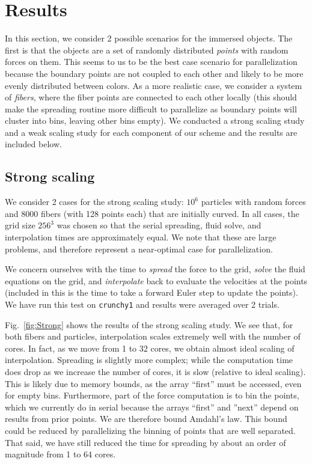 \documentclass[]{article}
\begin{document}
\section{Results}
In this section, we consider 2 possible scenarios for the immersed objects. The first is that the objects are a set of randomly distributed \textit{points} with random forces on them. This seems to us to be the best case scenario for parallelization because the boundary points are not coupled to each other and likely to be more evenly distributed between colors. As a more realistic case, we consider a system of \textit{fibers}, where the fiber points are connected to each other locally (this should make the spreading routine more difficult to parallelize as boundary points will cluster into bins, leaving other bins empty). We conducted a strong scaling study and a weak scaling study for each component of our scheme and the results are included below.

\subsection{Strong scaling}
We consider 2 cases for the strong scaling study: $10^6$ particles with random forces and 8000 fibers (with 128 points each) that are initially curved. In all cases, the grid size $256^3$ was chosen so that the serial spreading, fluid solve, and interpolation times are approximately equal. We note that these are large problems, and therefore represent a near-optimal case for parallelization. 

We concern ourselves with the time to \textit{spread} the force to the grid, \textit{solve} the fluid equations on the grid, and \textit{interpolate} back to evaluate the velocities at the points (included in this is the time to take a forward Euler step to update the points). We have run this test on \texttt{crunchy1} and results were averaged over 2 trials. 

Fig.\ \ref{fig:Strong} shows the results of the strong scaling study. We see that, for both fibers and particles, interpolation scales extremely well with the number of cores. In fact, as we move from 1 to 32 cores, we obtain almost ideal scaling of interpolation. Spreading is slightly more complex; while the computation time does drop as we increase the number of cores, it is slow (relative to ideal scaling). This is likely due to memory bounds, as the array ``first'' must be accessed, even for empty bins. Furthermore, part of the force computation is to bin the points, which we currently do in serial because the arrays ``first'' and ''next'' depend on results from prior points. We are therefore bound Amdahl's law. This bound could be reduced by parallelizing the binning of points that are well separated. That said, we have still reduced the time for spreading by about an order of magnitude from 1 to 64 cores. 
\end{document}
